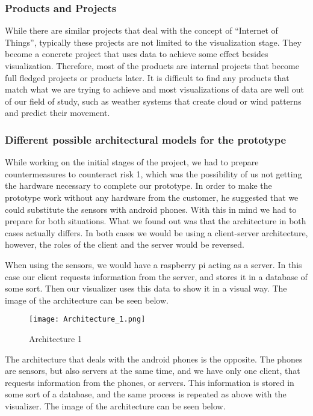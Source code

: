 \documentclass[../document.tex]{subfiles}
\begin{document}
\subsubsection{Products and Projects}
While there are similar projects that deal with the concept of ``Internet of Things'', typically these projects are not limited to the visualization stage. They become a concrete project that uses data to achieve some effect besides visualization. Therefore, most of the products are internal projects that become full fledged projects or products later. It is difficult to find any products that match what we are trying to achieve and most visualizations of data are well out of our field of study, such as weather systems that create cloud or wind patterns and predict their movement.

\subsubsection{Different possible architectural models for the prototype}
While working on the initial stages of the project, we had to prepare countermeasures to counteract risk 1, which was the possibility of us not getting the hardware necessary to complete our prototype. In order to make the prototype work without any hardware from the customer, he suggested that we could substitute the sensors with android phones. With this in mind we had to prepare for both situations. What we found out was that the architecture in both cases actually differs. In both cases we would be using a client-server architecture, however, the roles of the client and the server would be reversed.

When using the sensors, we would have a raspberry pi acting as a server. In this case our client requests information from the server, and stores it in a database of some sort. Then our visualizer uses this data to show it in a visual way. The image of the architecture can be seen below.

\begin{figure}[H]
	\centering
		\texttt{[image: Architecture\_1.png]}
	\caption{Architecture 1}
\end{figure}

The architecture that deals with the android phones is the opposite. The phones are sensors, but also servers at the same time, and we have only one client, that requests information from the phones, or servers. This information is stored in some sort of a database, and the same process is repeated as above with the visualizer. The image of the architecture can be seen below.
\end{document}
